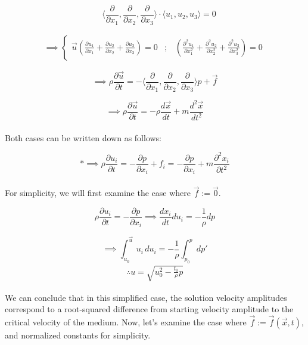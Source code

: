 \documentclass[12pt]{article}
\begin{document}
\[\quad \langle \frac{\partial }{\partial x_1}, \frac{\partial}{\partial x_2}, \frac{\partial}{\partial x_3} \rangle \cdot \langle u_{1}, u_{2}, u_{3}\rangle = 0 \]

\begin{align*}
\implies \begin{cases}
    \vec u \left( \frac{\partial u_{1}}{\partial x_1} + \frac{\partial u_{2}}{\partial x_2} + \frac{\partial u_{3}}{\partial x_3}  \right) = 0 \;\;\;;&
    \left( \frac{\partial^{2} u_{1}}{\partial x_1^{2}} + \frac{\partial^{2} u_{2}}{\partial x_2^{2}} + \frac{\partial^{2} u_{3}}{\partial x_3^{2}} \right) = 0 
\end{cases}    
\end{align*}

\[\implies \rho \frac{\partial \vec u }{\partial t} = -\langle \frac{\partial}{\partial x_1}, \frac{\partial}{\partial x_2}, \frac{\partial}{\partial x_{3}} \rangle p + \vec f\]

\[
\implies \rho \frac{\partial \vec{u}}{\partial t} = -\rho \frac{d\vec x}{dt} + m \frac{d^{2}\vec x}{dt^{2}}
\] \\ Both cases can be written down as follows: 

\[*
\implies \rho \frac{\partial u_{i}}{\partial t} = -\frac{\partial p}{\partial x_{i}} + f_{i} = -\frac{\partial p}{\partial x_{i}} + m \frac{\partial^{2} x_{i}}{\partial t^{2}}
\] \\
For simplicity, we will first examine the case where $\vec f := \vec 0$.

\[
\rho \frac{\partial u_{i}}{\partial t} = -\frac{\partial p}{\partial x_{i}} \implies \frac{dx_{i}}{d t} du_{i} = -\frac{1}{\rho} dp
\]

\[
\implies \int_{u_{0}}^{\vec u} u_{i} \, du_{i} = -\frac{1}{\rho} \int_{p_0}^{p} dp'
\]
\begin{align}
    \therefore u = \sqrt{u_{0}^{2} - \frac{t_{0}}{\rho} p }
\end{align}

We can conclude that in this simplified case, the solution velocity amplitudes correspond to a root-squared difference from starting velocity amplitude to the critical velocity of the medium. Now, let's examine the case where $\vec f := \vec f(\vec x, t)$, and normalized constants for simplicity. 
\end{document}
